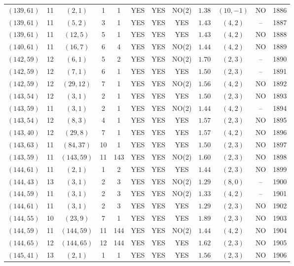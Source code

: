 \begin{longtable}{|c|c|c|c|c|c|c|c|c|c|c|c|}
$(139,61)$ & 11 & $(2,1)$ & 1 & 1 & YES & YES & NO(2) & $1.38$ & $(10,-1)$ & NO & 1886\\
$(139,61)$ & 11 & $(5,2)$ & 3 & 1 & YES & YES & YES & $1.43$ & $(4,2)$ & -- & 1887\\
$(139,61)$ & 11 & $(12,5)$ & 5 & 1 & YES & YES & YES & $1.43$ & $(4,2)$ & NO & 1888\\
$(140,61)$ & 11 & $(16,7)$ & 6 & 4 & YES & YES & NO(2) & $1.44$ & $(4,2)$ & NO & 1889\\
$(142,59)$ & 12 & $(6,1)$ & 5 & 2 & YES & YES & NO(2) & $1.70$ & $(2,3)$ & -- & 1890\\
$(142,59)$ & 12 & $(7,1)$ & 6 & 1 & YES & YES & YES & $1.50$ & $(2,3)$ & -- & 1891\\
$(142,59)$ & 12 & $(29,12)$ & 7 & 1 & YES & YES & NO(2) & $1.56$ & $(4,2)$ & NO & 1892\\
$(143,54)$ & 12 & $(3,1)$ & 2 & 1 & YES & YES & YES & $1.50$ & $(2,3)$ & NO & 1893\\
$(143,59)$ & 11 & $(3,1)$ & 2 & 1 & YES & YES & NO(2) & $1.44$ & $(4,2)$ & -- & 1894\\
$(143,54)$ & 12 & $(8,3)$ & 4 & 1 & YES & YES & YES & $1.57$ & $(2,3)$ & NO & 1895\\
$(143,40)$ & 12 & $(29,8)$ & 7 & 1 & YES & YES & YES & $1.57$ & $(4,2)$ & NO & 1896\\
$(143,63)$ & 11 & $(84,37)$ & 10 & 1 & YES & YES & YES & $1.50$ & $(2,3)$ & NO & 1897\\
$(143,59)$ & 11 & $(143,59)$ & 11 & 143 & YES & YES & NO(2) & $1.60$ & $(2,3)$ & NO & 1898\\
$(144,61)$ & 11 & $(2,1)$ & 1 & 2 & YES & YES & YES & $1.44$ & $(2,3)$ & NO & 1899\\
$(144,43)$ & 13 & $(3,1)$ & 2 & 3 & YES & YES & NO(2) & $1.29$ & $(8,0)$ & -- & 1900\\
$(144,59)$ & 11 & $(3,1)$ & 2 & 3 & YES & YES & NO(2) & $1.33$ & $(4,2)$ & -- & 1901\\
$(144,61)$ & 11 & $(3,1)$ & 2 & 3 & YES & YES & YES & $1.29$ & $(2,3)$ & NO & 1902\\
$(144,55)$ & 10 & $(23,9)$ & 7 & 1 & YES & YES & YES & $1.89$ & $(2,3)$ & NO & 1903\\
$(144,59)$ & 11 & $(144,59)$ & 11 & 144 & YES & YES & NO(2) & $1.44$ & $(4,2)$ & NO & 1904\\
$(144,65)$ & 12 & $(144,65)$ & 12 & 144 & YES & YES & YES & $1.62$ & $(2,3)$ & NO & 1905\\
$(145,41)$ & 13 & $(2,1)$ & 1 & 1 & YES & YES & YES & $1.56$ & $(2,3)$ & NO & 1906\\

\end{longtable}
